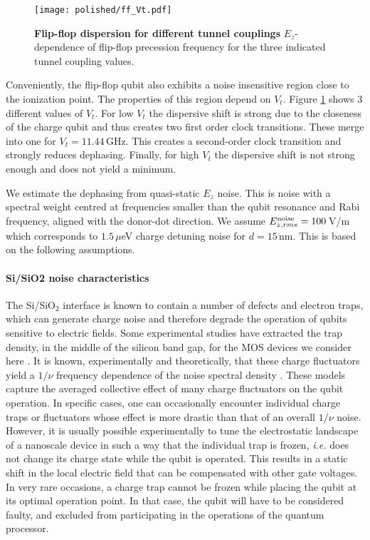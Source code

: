 \begin{figure}[h]
	\centering
	\texttt{[image: polished/ff\_Vt.pdf]}
	\caption[Flip-flop dispersion for different tunnel couplings]{\textbf{Flip-flop dispersion for different tunnel couplings} $E_z$-dependence of flip-flop precession frequency for the three indicated tunnel coupling values.}
	\label{fig:ff_Vt}
\end{figure}


Conveniently, the flip-flop qubit also exhibits a noise insensitive region close to the ionization point. The properties of this region depend on $V_t$. Figure \ref{fig:ff_Vt} shows 3 different values of $V_t$. For low $V_t$ the dispersive shift is strong due to the closeness of the charge qubit and thus creates two first order clock transitions. These merge into one for $V_t=11.44\,$GHz. This creates a second-order clock transition and strongly reduces dephasing. Finally, for high $V_t$ the dispersive shift is not strong enough and does not yield a minimum. 

We estimate the dephasing from quasi-static $E_z$ noise. This is noise with a spectral weight centred at frequencies smaller than the qubit resonance and Rabi frequency, aligned with the donor-dot direction. We assume $E_{z, rms}^{\rm noise}=100\,$V/m  which corresponds to $1.5\,\mu$eV charge detuning noise for $d=15\,$nm. This is based on the following assumptions. 

\paragraph{Si/SiO2 noise characteristics} 

The Si/SiO$_2$ interface is known to contain a number of defects and electron traps, which can generate charge noise and therefore degrade the operation of qubits sensitive to electric fields. Some experimental studies have extracted the trap density, in the middle of the silicon band gap, for the MOS devices we consider here \cite{Johnson2010}. It is known, experimentally and theoretically, that these charge fluctuators yield a $1/\nu$ frequency dependence of the noise spectral density \cite{Paladino2014}. These models capture the averaged collective effect of many charge fluctuators on the qubit operation. In specific cases, one can occasionally encounter individual charge traps or fluctuators whose effect is more drastic than that of an overall $1/\nu$ noise. However, it is usually possible experimentally to tune the electrostatic landscape of a nanoscale device in such a way that the individual trap is frozen, \textit{i.e.} does not change its charge state while the qubit is operated. This results in a static shift in the local electric field that can be compensated with other gate voltages. In very rare occasions, a charge trap cannot be frozen while placing the qubit at its optimal operation point. In that case, the qubit will have to be considered faulty, and excluded from participating in the operations of the quantum processor.

